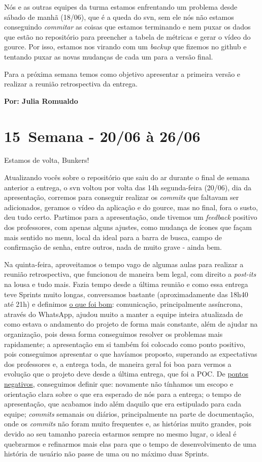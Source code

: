 Nós e as outras equipes da turma estamos enfrentando um problema desde sábado de manhã (18/06), que é a queda do \gls{svn}, sem ele nós não estamos conseguindo \textit{commitar} as coisas que estamos terminando e nem puxar os dados que estão no repositório para preencher a tabela de métricas e gerar o vídeo do \gls{gource}. Por isso, estamos nos virando com um \textit{backup} que fizemos no \gls{github} e tentando puxar as novas mudanças de cada um para a versão final.

Para a próxima semana temos como objetivo apresentar a primeira versão e realizar a reunião retrospectiva da entrega. 

\textbf{Por: Julia Romualdo}

\section{15\textordfeminine \, Semana - 20/06 à 26/06}
Estamos de volta, Bunkers!

Atualizando vocês sobre o repositório que saiu do ar durante o final de semana anterior a entrega, o \acs{svn} voltou por volta das 14h segunda-feira (20/06), dia da apresentação, corremos para conseguir realizar os \textit{commits} que faltavam ser adicionados, geramos o vídeo da aplicação e do \gls{gource}, mas no final, fora o susto, deu tudo certo. Partimos para a apresentação, onde tivemos um \textit{feedback} positivo dos professores, com apenas alguns ajustes, como mudança de ícones que façam mais sentido no menu, local da ideal para a barra de busca, campo de confirmação de senha, entre outros, nada de muito grave - ainda bem. 

Na quinta-feira, aproveitamos o tempo vago de algumas aulas para realizar a reunião retrospectiva, que funcionou de maneira bem legal, com direito a \textit{post-its} na lousa e tudo mais. Fazia tempo desde a última reunião e como essa entrega teve \glspl{Sprint} muito longas, conversamos bastante (aproximadamente das 18h40 até 21h) e definimos \underline{o que foi bom}: comunicação, principalmente assíncrona, através do \gls{WhatsApp}, ajudou muito a manter a equipe inteira atualizada de como estava o andamento do projeto de forma mais constante, além de ajudar na organização, pois dessa forma conseguimos resolver os problemas mais rapidamente; a apresentação em si também foi colocado como ponto positivo, pois conseguimos apresentar o que havíamos proposto, superando as expectativas dos professores e, a entrega toda, de maneira geral foi boa para vermos a evolução que o projeto deve desde a última entrega, que foi a \acs{POC}. De \underline{pontos negativos}, conseguimos definir que: novamente não tínhamos um escopo e orientação clara sobre o que era esperado de nós para a entrega; o tempo de apresentação, que acabamos indo além daquilo que era estipulado para cada equipe; \textit{commits} semanais ou diários, principalmente na parte de documentação, onde os \textit{commits} não foram muito frequentes e, as histórias muito grandes, pois devido ao seu tamanho parecia estarmos sempre no mesmo lugar, o ideal é quebrarmos e refinarmos mais elas para que o tempo de desenvolvimento de uma história de usuário não passe de uma ou no máximo duas \glspl{Sprint}.

